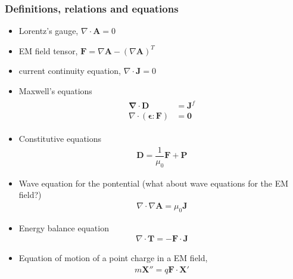\documentclass[letterpaper,10pt,english]{jupyterBook}
\begin{document}
\subsubsection*{Definitions, relations and equations}
\begin{itemize}
\item {} 
\sphinxAtStartPar
Lorentz’s gauge, \(\nabla \cdot \mathbf{A} = 0\)

\item {} 
\sphinxAtStartPar
EM field tensor, \(\mathbf{F} = \nabla \mathbf{A} - \left( \nabla \mathbf{A} \right)^T\)

\item {} 
\sphinxhyphen{}current continuity equation, \(\nabla \cdot \mathbf{J} = 0\)

\item {} 
\sphinxAtStartPar
Maxwell’s equations
\begin{equation*}
\begin{split}\begin{aligned}
      \mathbf{\nabla} \cdot \mathbf{D} & = \mathbf{J}^f \\
      \nabla \cdot \left( \symbf{\epsilon} : \mathbf{F} \right) & = \mathbf{0}
    \end{aligned}\end{split}
\end{equation*}
\item {} 
\sphinxAtStartPar
Constitutive equations
\begin{equation*}
\begin{split}\mathbf{D} = \dfrac{1}{\mu_0} \mathbf{F} + \mathbf{P}\end{split}
\end{equation*}
\item {} 
\sphinxAtStartPar
Wave equation for the pontential (what about wave equations for the EM field?)
\begin{equation*}
\begin{split}\nabla \cdot \nabla \mathbf{A} = \mu_0 \mathbf{J}\end{split}
\end{equation*}
\item {} 
\sphinxAtStartPar
Energy balance equation
\begin{equation*}
\begin{split}\nabla \cdot \mathbf{T} = - \mathbf{F} \cdot \mathbf{J}\end{split}
\end{equation*}
\item {} 
\sphinxAtStartPar
Equation of motion of a point charge in a EM field,
\begin{equation*}
\begin{split}m \mathbf{X}'' = q \mathbf{F} \cdot \mathbf{X}'\end{split}
\end{equation*}
\end{itemize}
\end{document}
